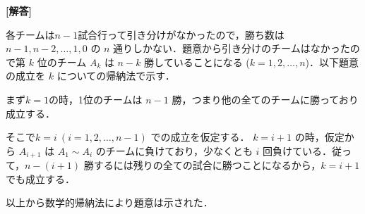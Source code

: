 \documentclass[../../main.tex]{subfiles}
\begin{document}
\begin{oframed}
  
\end{oframed}

{\bf [解答]}

各チームは$n-1$試合行って引き分けがなかったので，勝ち数は $n-1, n-2, \dots, 1, 0$ の $n$ 通りしかない．題意から引き分けのチームはなかったので第 $k$ 位のチーム $A_k$ は $n-k$ 勝していることになる ($k=1, 2, \dots, n$)．以下題意の成立を $k$ についての帰納法で示す．

まず$k=1$の時，1位のチームは $n-1$ 勝，つまり他の全てのチームに勝っており成立する．

そこで$k=i \ (i=1, 2, \dots, n-1)$ での成立を仮定する．
$k=i+1$ の時，仮定から $A_{i+1}$ は $A_1 \sim A_i$ のチームに負けており，少なくとも $i$ 回負けている．従って，$n-(i+1)$ 勝するには残りの全ての試合に勝つことになるから，$k=i+1$ でも成立する．

以上から数学的帰納法により題意は示された．

\newpage
\end{document}

